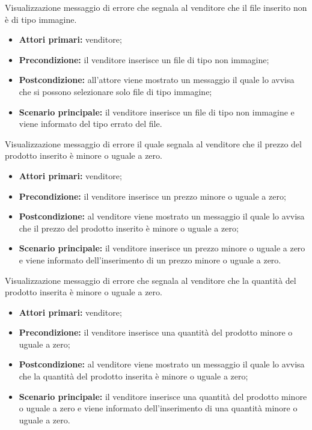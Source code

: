 Visualizzazione messaggio di errore che segnala al venditore che il file inserito non è di tipo immagine.
\begin{itemize}
    \item \textbf{Attori primari:} venditore;
    \item \textbf{Precondizione:} il venditore inserisce un file di tipo non immagine;
    \item \textbf{Postcondizione:} all'attore viene mostrato un messaggio il quale lo avvisa che si possono selezionare solo file di tipo immagine;
    \item \textbf{Scenario principale:} il venditore inserisce un file di tipo non immagine e viene informato del tipo errato del file.
\end{itemize}

Visualizzazione messaggio di errore il quale segnala al venditore che il prezzo del prodotto inserito è minore o uguale a zero.
\begin{itemize}
    \item \textbf{Attori primari:} venditore;
    \item \textbf{Precondizione:} il venditore inserisce un prezzo minore o uguale a zero;
    \item \textbf{Postcondizione:} al venditore viene mostrato un messaggio il quale lo avvisa che il prezzo del prodotto inserito è minore o uguale a zero;
    \item \textbf{Scenario principale:} il venditore inserisce un prezzo minore o uguale a zero e viene informato dell'inserimento di un prezzo minore o uguale a zero.
\end{itemize}

Visualizzazione messaggio di errore che segnala al venditore che la quantità del prodotto inserita è minore o uguale a zero.
\begin{itemize}
    \item \textbf{Attori primari:} venditore;
    \item \textbf{Precondizione:} il venditore inserisce una quantità del prodotto minore o uguale a zero;
    \item \textbf{Postcondizione:} al venditore viene mostrato un messaggio il quale lo avvisa che la quantità del prodotto inserita è minore o uguale a zero;
    \item \textbf{Scenario principale:} il venditore inserisce una quantità del prodotto minore o uguale a zero e viene informato dell'inserimento di una quantità minore o uguale a zero.
\end{itemize}

